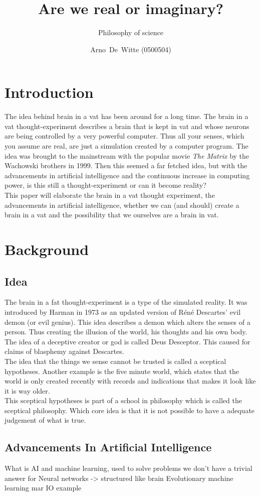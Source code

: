 \documentclass[a4paper]{article}
\author{Arno~De~Witte (0500504)}
\title{Are we real or imaginary?}
\subtitle{Philosophy of science}
\begin{document}
\makeassignment
\section{Introduction}
The idea behind brain in a vat has been around for a long time. The brain in a vat thought-experiment describes a brain that is kept in vat and whose neurons are being controlled by a very powerful computer. Thus all your senses, which you assume are real, are just a simulation created by a computer program. The idea was brought to the mainstream with the popular movie \emph{The Matrix} by the Wachowski brothers in 1999. Then this seemed a far fetched idea, but with the advancements in artificial intelligence and the continuous increase in computing power, is this still a thought-experiment or can it become reality?\\

This paper will elaborate the brain in a vat thought experiment, the advancements in artificial intelligence, whether we can (and should) create a brain in a vat and the possibility that we ourselves are a brain in vat.

\section{Background}
\subsection{Idea}
The brain in a fat thought-experiment is a type of the simulated reality. It was introduced by Harman \cite{Harman15} in 1973 as an updated version of Réné Descartes' evil demon (or evil genius). This idea describes a demon which alters the senses of a person. Thus creating the illusion of the world, his thoughts and his own body. The idea of a deceptive creator or god is called Deus Desceptor. This caused for claims of blasphemy against Descartes.\\

The idea that the things we sense cannot be trusted is called a sceptical hypotheses. Another example is the five minute world, which states that the world is only created recently with records and indications that makes it look like it is way older.\\
This sceptical hypotheses is part of a school in philosophy which is called the sceptical philosophy. Which core idea is that it is not possible to have a adequate judgement of what is true.

\subsection{Advancements In Artificial Intelligence}
What is AI and machine learning, used to solve problems we don't have a trivial answer for
Neural networks -> structured like brain
Evolutionary machine learning
mar IO example
\end{document}
